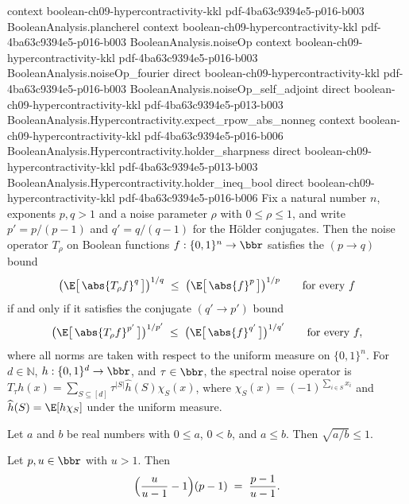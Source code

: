 \begin{lemma}
  {context}
  {boolean-ch09-hypercontractivity-kkl}
  {pdf-4ba63c9394e5-p016-b003}
\proofstep
  {BooleanAnalysis.plancherel}
  {context}
  {boolean-ch09-hypercontractivity-kkl}
  {pdf-4ba63c9394e5-p016-b003}
\proofstep
  {BooleanAnalysis.noiseOp}
  {context}
  {boolean-ch09-hypercontractivity-kkl}
  {pdf-4ba63c9394e5-p016-b003}
\proofstep
  {BooleanAnalysis.noiseOp_fourier}
  {direct}
  {boolean-ch09-hypercontractivity-kkl}
  {pdf-4ba63c9394e5-p016-b003}
\proofstep
  {BooleanAnalysis.noiseOp_self_adjoint}
  {direct}
  {boolean-ch09-hypercontractivity-kkl}
  {pdf-4ba63c9394e5-p013-b003}
\proofstep
  {BooleanAnalysis.Hypercontractivity.expect_rpow_abs_nonneg}
  {context}
  {boolean-ch09-hypercontractivity-kkl}
  {pdf-4ba63c9394e5-p016-b006}
\proofstep
  {BooleanAnalysis.Hypercontractivity.holder_sharpness}
  {direct}
  {boolean-ch09-hypercontractivity-kkl}
  {pdf-4ba63c9394e5-p013-b003}
\proofstep
  {BooleanAnalysis.Hypercontractivity.holder_ineq_bool}
  {direct}
  {boolean-ch09-hypercontractivity-kkl}
  {pdf-4ba63c9394e5-p016-b006}
Fix a natural number $n$, exponents $p,q>1$ and a noise parameter $\rho$ with $0 \le
\rho \le 1$, and write
$p' = p/(p-1)$ and $q' = q/(q-1)$ for the H\"older conjugates. Then the noise operator
$T_\rho$ on Boolean functions $f : \{0,1\}^n \to \bbr$ satisfies the $(p \to q)$ bound
\[
\bigl(\E\bigl[\,\abs{T_\rho f}^q\,\bigr]\bigr)^{1/q} \;\le\;
\bigl(\E\bigl[\,\abs{f}^p\,\bigr]\bigr)^{1/p}
  \qquad \text{for every } f
\]
if and only if it satisfies the conjugate $(q' \to p')$ bound
\[
\bigl(\E\bigl[\,\abs{T_\rho f}^{p'}\,\bigr]\bigr)^{1/p'} \;\le\;
\bigl(\E\bigl[\,\abs{f}^{q'}\,\bigr]\bigr)^{1/q'}
  \qquad \text{for every } f,
\]
where all norms are taken with respect to the uniform measure on $\{0,1\}^n$. For
$d\in\mathbb N$, $h:\{0,1\}^d\to\bbr$, and $\tau\in\bbr$, the spectral noise operator is
$T_\tau h(x)=\sum_{S\subseteq[d]}\tau^{|S|}\widehat h(S)\chi_S(x)$, where
$\chi_S(x)=(-1)^{\sum_{i\in S}x_i}$ and $\widehat h(S)=\E[h\chi_S]$ under the uniform
measure.
\end{lemma}

\begin{lemma}
\leanok
{}
\label{BooleanAnalysis.Hypercontractivity.Interpolation.sqrt_div_le_one}
Let $a$ and $b$ be real numbers with $0 \le a$, $0 < b$, and $a \le b$. Then $\sqrt{a/b}
\le 1$.
\end{lemma}

\begin{lemma}
\leanok
{}
\label{BooleanAnalysis.Hypercontractivity.noise_param_eq}
Let $p, u \in \bbr$ with $u > 1$. Then
\[
  \Bigl(\frac{u}{u-1} - 1\Bigr)(p-1) \;=\; \frac{p-1}{u-1}.
\]
\end{lemma}

